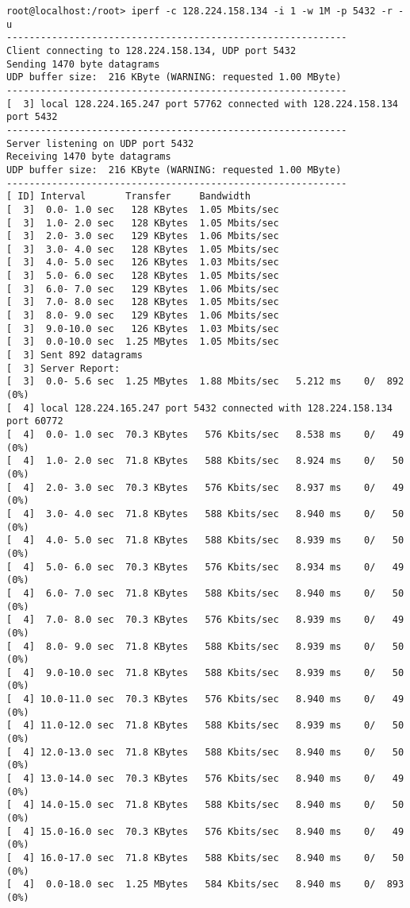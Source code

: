 \documentclass[a4paper]{report}
\begin{document}
\begin{lstlisting}
root@localhost:/root> iperf -c 128.224.158.134 -i 1 -w 1M -p 5432 -r -u
------------------------------------------------------------
Client connecting to 128.224.158.134, UDP port 5432
Sending 1470 byte datagrams
UDP buffer size:  216 KByte (WARNING: requested 1.00 MByte)
------------------------------------------------------------
[  3] local 128.224.165.247 port 57762 connected with 128.224.158.134 port 5432
------------------------------------------------------------
Server listening on UDP port 5432
Receiving 1470 byte datagrams
UDP buffer size:  216 KByte (WARNING: requested 1.00 MByte)
------------------------------------------------------------
[ ID] Interval       Transfer     Bandwidth
[  3]  0.0- 1.0 sec   128 KBytes  1.05 Mbits/sec
[  3]  1.0- 2.0 sec   128 KBytes  1.05 Mbits/sec
[  3]  2.0- 3.0 sec   129 KBytes  1.06 Mbits/sec
[  3]  3.0- 4.0 sec   128 KBytes  1.05 Mbits/sec
[  3]  4.0- 5.0 sec   126 KBytes  1.03 Mbits/sec
[  3]  5.0- 6.0 sec   128 KBytes  1.05 Mbits/sec
[  3]  6.0- 7.0 sec   129 KBytes  1.06 Mbits/sec
[  3]  7.0- 8.0 sec   128 KBytes  1.05 Mbits/sec
[  3]  8.0- 9.0 sec   129 KBytes  1.06 Mbits/sec
[  3]  9.0-10.0 sec   126 KBytes  1.03 Mbits/sec
[  3]  0.0-10.0 sec  1.25 MBytes  1.05 Mbits/sec
[  3] Sent 892 datagrams
[  3] Server Report:
[  3]  0.0- 5.6 sec  1.25 MBytes  1.88 Mbits/sec   5.212 ms    0/  892 (0%)
[  4] local 128.224.165.247 port 5432 connected with 128.224.158.134 port 60772
[  4]  0.0- 1.0 sec  70.3 KBytes   576 Kbits/sec   8.538 ms    0/   49 (0%)
[  4]  1.0- 2.0 sec  71.8 KBytes   588 Kbits/sec   8.924 ms    0/   50 (0%)
[  4]  2.0- 3.0 sec  70.3 KBytes   576 Kbits/sec   8.937 ms    0/   49 (0%)
[  4]  3.0- 4.0 sec  71.8 KBytes   588 Kbits/sec   8.940 ms    0/   50 (0%)
[  4]  4.0- 5.0 sec  71.8 KBytes   588 Kbits/sec   8.939 ms    0/   50 (0%)
[  4]  5.0- 6.0 sec  70.3 KBytes   576 Kbits/sec   8.934 ms    0/   49 (0%)
[  4]  6.0- 7.0 sec  71.8 KBytes   588 Kbits/sec   8.940 ms    0/   50 (0%)
[  4]  7.0- 8.0 sec  70.3 KBytes   576 Kbits/sec   8.939 ms    0/   49 (0%)
[  4]  8.0- 9.0 sec  71.8 KBytes   588 Kbits/sec   8.939 ms    0/   50 (0%)
[  4]  9.0-10.0 sec  71.8 KBytes   588 Kbits/sec   8.939 ms    0/   50 (0%)
[  4] 10.0-11.0 sec  70.3 KBytes   576 Kbits/sec   8.940 ms    0/   49 (0%)
[  4] 11.0-12.0 sec  71.8 KBytes   588 Kbits/sec   8.939 ms    0/   50 (0%)
[  4] 12.0-13.0 sec  71.8 KBytes   588 Kbits/sec   8.940 ms    0/   50 (0%)
[  4] 13.0-14.0 sec  70.3 KBytes   576 Kbits/sec   8.940 ms    0/   49 (0%)
[  4] 14.0-15.0 sec  71.8 KBytes   588 Kbits/sec   8.940 ms    0/   50 (0%)
[  4] 15.0-16.0 sec  70.3 KBytes   576 Kbits/sec   8.940 ms    0/   49 (0%)
[  4] 16.0-17.0 sec  71.8 KBytes   588 Kbits/sec   8.940 ms    0/   50 (0%)
[  4]  0.0-18.0 sec  1.25 MBytes   584 Kbits/sec   8.940 ms    0/  893 (0%)
\end{lstlisting}
\end{document}
